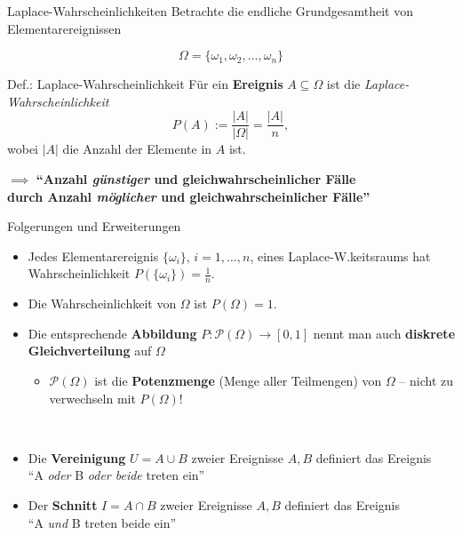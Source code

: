 \documentclass[
  10pt,
  ignorenonframetext,
]{beamer}
\providecommand{\tightlist}{%
  \setlength{\itemsep}{0pt}\setlength{\parskip}{0pt}}
\begin{document}
\begin{frame}{Laplace-Wahrscheinlichkeiten}
\protect\hypertarget{laplace-wahrscheinlichkeiten-1}{}
Betrachte die endliche Grundgesamtheit von Elementarereignissen

\[\Omega = \{\omega_1, \omega_2, ..., \omega_n \}\]

\begin{block}{Def.: Laplace-Wahrscheinlichkeit}
\protect\hypertarget{def.-laplace-wahrscheinlichkeit}{}
Für ein \textbf{Ereignis} \(A \subseteq \Omega\) ist die
\emph{Laplace-Wahrscheinlichkeit}
\[P(A) := \frac{|A|}{|\Omega|} = \frac{|A|}{n},\] wobei \(|A|\) die
Anzahl der Elemente in \(A\) ist.
\end{block}

\(\implies\) \textbf{``Anzahl \emph{günstiger} und
gleichwahrscheinlicher Fälle\\
durch Anzahl \emph{möglicher} und gleichwahrscheinlicher Fälle''}

\end{frame}

\begin{frame}{Folgerungen und Erweiterungen}
\protect\hypertarget{folgerungen-und-erweiterungen}{}
\begin{itemize}
\item
  Jedes Elementarereignis \(\{\omega_i\}\), \(i = 1, \ldots, n\), eines
  Laplace-W.keitsraums hat Wahrscheinlichkeit
  \(P(\{\omega_i\})=\frac{1}{n}\).
\item
  Die Wahrscheinlichkeit von \(\Omega\) ist \(P(\Omega)=1\).\\
\item
  Die entsprechende \textbf{Abbildung}
  \(P:{\mathcal P}(\Omega) \to [0,1]\) nennt man auch \textbf{diskrete
  Gleichverteilung} auf \(\Omega\)

  \begin{itemize}
  \tightlist
  \item
    \({\mathcal P}(\Omega)\) ist die \textbf{Potenzmenge} (Menge aller
    Teilmengen) von \(\Omega\) -- nicht zu verwechseln mit
    \(P(\Omega)\)!\\
    \strut \\
  \end{itemize}
\item
  Die \textbf{Vereinigung} \(U = A \cup B\) zweier Ereignisse \(A, B\)
  definiert das Ereignis\\
  ``A \emph{oder} B \emph{oder beide} treten ein''
\item
  Der \textbf{Schnitt} \(I = A \cap B\) zweier Ereignisse \(A, B\)
  definiert das Ereignis\\
  ``A \emph{und} B treten beide ein''
\end{itemize}
\end{frame}
\end{document}
